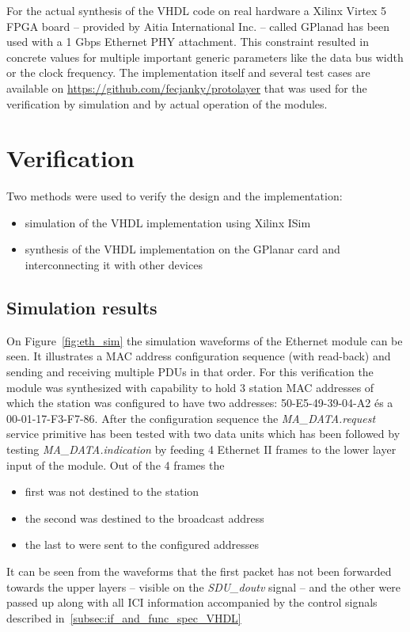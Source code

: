 \documentclass[conference]{IEEEtran}
\begin{document}
For the actual synthesis of the VHDL code on real hardware a Xilinx Virtex 5 FPGA board -- provided by Aitia International Inc. -- called GPlanad has been used with a 1 Gbps Ethernet PHY attachment. This constraint resulted in concrete values for multiple important generic parameters like the data bus width or the clock frequency. The implementation itself and several test cases are available on \url{https://github.com/fecjanky/protolayer} that was used for the verification by simulation and by actual operation of the modules.

\section{Verification}\label{sec:Verification}

Two methods were used to verify the design and the implementation:
\begin{itemize}
\renewcommand \labelitemi{--}
\item simulation of the VHDL implementation using Xilinx ISim
\item synthesis of the VHDL implementation on the GPlanar card and interconnecting it with other devices
\end{itemize}

\subsection{Simulation results}

On Figure~\ref{fig:eth_sim} the simulation waveforms of the Ethernet module can be seen. It illustrates a MAC address configuration sequence (with read-back) and sending and receiving multiple PDUs in that order. For this verification the module was synthesized with capability to hold 3 station MAC addresses of which the station was configured to have two addresses: 50-E5-49-39-04-A2 és a 00-01-17-F3-F7-86. After the configuration sequence the \emph{MA\_DATA.request} service primitive has been tested with two data units which has been followed by testing \emph{MA\_DATA.indication} by feeding 4 Ethernet II frames to the lower layer input of the module. Out of the 4 frames the 
\begin{itemize}
\renewcommand \labelitemi{--}
\item first was not destined to the station
\item the second was destined to the broadcast address
\item the last to were sent to the configured addresses
\end{itemize}
It can be seen from the waveforms that the first packet has not been forwarded towards the upper layers -- visible on the \emph{SDU\_doutv} signal -- and the other were passed up along with all ICI information accompanied by the control signals described in~\ref{subsec:if_and_func_spec_VHDL}
\end{document}
